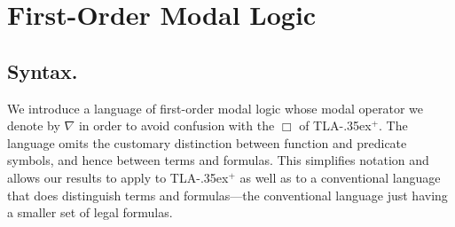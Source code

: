 \documentclass{easychair}
\newcommand{\tlaplus}{\mbox{TLA\kern -.35ex$^+$}\xspace}
\newcommand{\modal}{\nabla}
\newcommand{\edmargin}[2]{\marginpar{\raggedright\footnotesize\color{red}#1: #2}}
\newcommand{\edmargin}[2]{}
\def\llnote{\ednote{LL}}
\def\llmargin{\edmargin{LL}}
\begin{document}

%


\section{First-Order Modal Logic}
\label{sec:foml}
\subsection{Syntax.}

We introduce a language of first-order modal logic whose modal operator we
denote by $\modal$ in order to avoid confusion with the $\Box$ of \tlaplus.
The language omits the
customary distinction between function and predicate symbols, and
hence between terms and formulas.  This simplifies notation and allows our
results to apply to \tlaplus as well as to a conventional language
that does distinguish terms and formulas---the conventional
language just having a smaller set
of legal formulas.
\end{document}

